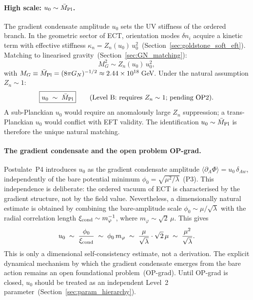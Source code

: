 \documentclass[11pt,a4paper]{article}
\numberwithin{equation}{section}
\begin{document}
\paragraph{High scale: $u_0\sim\bar{M}_{\rm Pl}$.}
The gradient condensate amplitude $u_0$ sets the UV stiffness
of the ordered branch.
In the geometric sector of ECT, orientation modes $\delta n_i$
acquire a kinetic term with effective stiffness
$\kappa_n = Z_n(u_0)\,u_0^2$~(Section~\ref{sec:goldstone_soft_eft}).
Matching to linearised gravity~(Section~\ref{sec:GN_matching}):
\begin{equation}
  M_G^2 \sim Z_n(u_0)\,u_0^2,
  \label{eq:MG_u0}
\end{equation}
with $M_G\equiv\bar{M}_{\rm Pl}=(8\pi G_N)^{-1/2}
\approx2.44\times10^{18}$\,GeV.
Under the natural assumption $Z_n\sim1$:
\begin{equation}
  \boxed{u_0 \;\sim\; \bar{M}_{\rm Pl}}
  \qquad\text{(Level~B: requires }Z_n\sim1\text{; pending OP2).}
  \label{eq:u0_Mpl}
\end{equation}
A sub-Planckian $u_0$ would require an anomalously large $Z_n$
suppression; a trans-Planckian $u_0$ would conflict with EFT
validity. The identification $u_0\sim\bar{M}_{\rm Pl}$ is
therefore the unique natural matching.

\paragraph{The gradient condensate and the open problem OP-grad.}
Postulate~P4 introduces $u_0$ as the gradient condensate amplitude
$\langle\partial_A\Phi\rangle = u_0\,\delta_{Aw}$, independently
of the bare potential minimum
$\phi_0 = \sqrt{\mu^2/\lambda}$~(P3).
This independence is deliberate: the ordered vacuum of ECT is
characterised by the gradient structure, not by the field value.
Nevertheless, a dimensionally natural estimate is obtained by
combining the bare-amplitude scale
$\phi_0\sim\mu/\sqrt{\lambda}$ with the radial correlation length
$\xi_{\rm cond}\sim m_\varphi^{-1}$, where
$m_\varphi\sim\sqrt{2}\,\mu$.
This gives
\begin{equation}
  u_0 \;\sim\; \frac{\phi_0}{\xi_{\rm cond}}
  \;\sim\; \phi_0\,m_\varphi
  \;\sim\; \frac{\mu}{\sqrt{\lambda}}\cdot\sqrt{2}\,\mu
  \;\sim\; \frac{\mu^2}{\sqrt{\lambda}}.
  \label{eq:u0_dimensional}
\end{equation}
This is only a dimensional self-consistency estimate, not a
derivation.
The explicit dynamical mechanism by which the gradient condensate
emerges from the bare action remains an open foundational
problem~(OP-grad).
Until OP-grad is closed, $u_0$ should be treated as an
independent Level~2 parameter~(Section~\ref{sec:param_hierarchy}).
\end{document}
